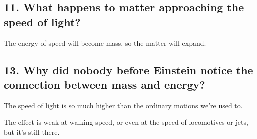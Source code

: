 \subsection*{11. What happens to matter approaching the speed of light?}
The energy of speed will become mass, so the matter will expand.



\subsection*{13. Why did nobody before Einstein notice the connection between mass and energy?}
The speed of light is so much higher than the ordinary motions we're used to.

The effect is weak at walking speed, or even at the speed of locomotives or jets, but it's still there.